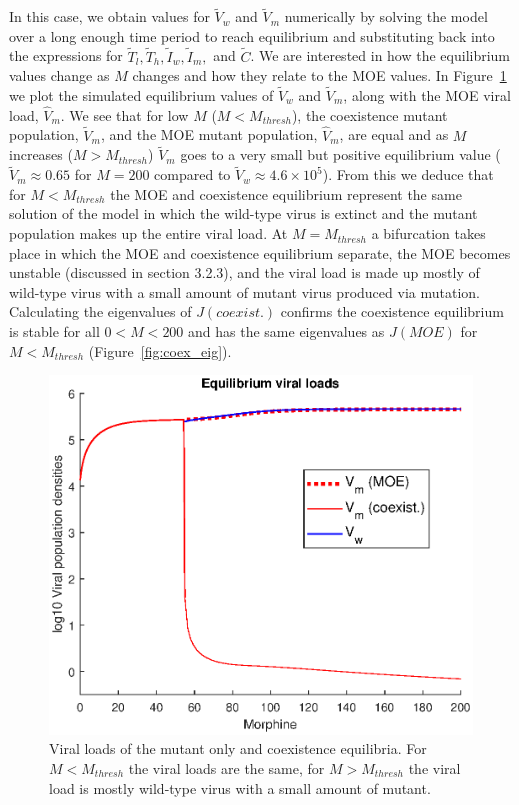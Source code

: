 \documentclass[11pt, oneside]{article}    %
\begin{document}
In this case, we obtain values for $\tilde{V}_w$ and $\tilde{V}_m$ numerically by solving the model over a long enough time period to reach equilibrium and substituting back into the expressions for $\tilde{T}_l, \tilde{T}_h, \tilde{I}_w,\tilde{I}_m,$ and $\tilde{C} $. We are interested in how the equilibrium values change as $M$ changes and how they relate to the MOE values. In Figure~\ref{fig:eq_vload} we plot the simulated equilibrium values of $\tilde{V}_w$ and $\tilde{V}_m$, along with the MOE viral load, $\hat{V}_m$. We see that for low $M$ ($M < M_{thresh}$), the coexistence mutant population, $\tilde{V}_m$, and the MOE mutant population,  $\hat{V}_m$, are equal and as $M$ increases ($M > M_{thresh}$) $\tilde{V}_m$ goes to a very small but positive equilibrium value ($\tilde{V}_m \approx 0.65$ for $M=200$ compared to $\tilde{V}_w \approx 4.6 \times 10^5$). From this we deduce that for $M < M_{thresh}$ the MOE and coexistence equilibrium represent the same solution of the model in which the wild-type virus is extinct and the mutant population makes up the entire viral load. At $M = M_{thresh}$ a bifurcation takes place in which the MOE and coexistence equilibrium separate, the MOE becomes unstable (discussed in section 3.2.3), and the viral load is made up mostly of wild-type virus with a small amount of mutant virus produced via mutation. Calculating the eigenvalues of $J(coexist.)$ confirms the coexistence equilibrium is stable for all $0<M<200$ and has the same eigenvalues as $J(MOE)$ for $M < M_{thresh}$ (Figure~\ref{fig:coex_eig}).

\begin{figure}[h]
\begin{center}
\includegraphics[scale=0.75]{equil_viral_loads_compared.eps}
\caption{Viral loads of the mutant only and coexistence equilibria. For $M<M_{thresh}$ the viral loads are the same, for  $M > M_{thresh}$ the viral load is mostly wild-type virus with a small amount of mutant.}
\label{fig:eq_vload}
\end{center}
\end{figure}
\end{document}
